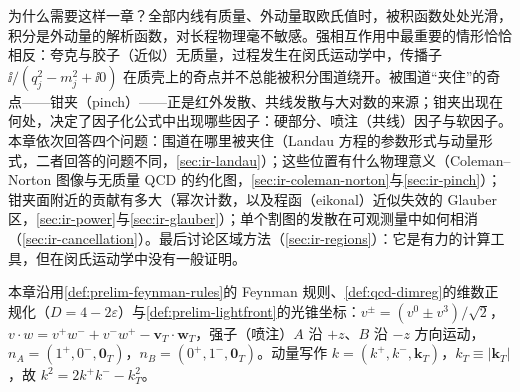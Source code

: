 为什么需要这样一章？全部内线有质量、外动量取欧氏值时，被积函数处处光滑，积分是外动量的解析函数，对长程物理毫不敏感。强相互作用中最重要的情形恰恰相反：夸克与胶子（近似）无质量，过程发生在闵氏运动学中，传播子 $\ii/(q_j^2-m_j^2+\ii0)$ 在质壳上的奇点并不总能被积分围道绕开。被围道“夹住”的奇点——钳夹（pinch）——正是红外发散、共线发散与大对数的来源；钳夹出现在何处，决定了因子化公式中出现哪些因子：硬部分、喷注（共线）因子与软因子。本章依次回答四个问题：围道在哪里被夹住（Landau 方程的参数形式与动量形式，二者回答的问题不同，\cref{sec:ir-landau}）；这些位置有什么物理意义（Coleman--Norton 图像与无质量 QCD 的约化图，\cref{sec:ir-coleman-norton}与\cref{sec:ir-pinch}）；钳夹面附近的贡献有多大（幂次计数，以及程函（eikonal）近似失效的 Glauber 区，\cref{sec:ir-power}与\cref{sec:ir-glauber}）；单个割图的发散在可观测量中如何相消（\cref{sec:ir-cancellation}）。最后讨论区域方法（\cref{sec:ir-regions}）：它是有力的计算工具，但在闵氏运动学中没有一般证明。

本章沿用\cref{def:prelim-feynman-rules}的 Feynman 规则、\cref{def:qcd-dimreg}的维数正规化（$D=4-2\varepsilon$）与\cref{def:prelim-lightfront}的光锥坐标：$v^\pm=(v^0\pm v^3)/\sqrt2$，$v\cdot w=v^+w^-+v^-w^+-\mathbf v_T\cdot\mathbf w_T$，强子（喷注）$A$ 沿 $+z$、$B$ 沿 $-z$ 方向运动，$n_A=(1^+,0^-,\mathbf 0_T)$，$n_B=(0^+,1^-,\mathbf 0_T)$。动量写作 $k=(k^+,k^-,\mathbf k_T)$，$k_T\equiv|\mathbf k_T|$，故 $k^2=2k^+k^--k_T^2$。
